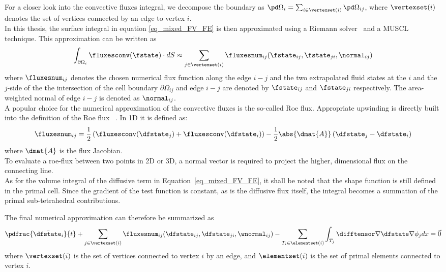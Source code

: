 \documentclass[../main.tex]{subfiles}
\begin{document}
For a closer look into the convective fluxes integral, we decompose the boundary as $\pd \Omega_i = \sum_{i \in \vertexset(i)} \pd\Omega_{ij}$, where $\vertexset(i)$ denotes the set of vertices connected by an edge to vertex $i$.\\
In this thesis, the surface integral in equation \eqref{eq_mixed_FV_FE} is then approximated using a Riemann solver~\cite{Roe1981} and a \ac{MUSCL} \cite{VanLeer1979} technique. This approximation can be written as
\begin{align}\label{eq:convectiveterm_approximation}
\int_{\partial\Omega_i} \fluxesconv(\fstate)\cdot dS \approx
\sum_{j \in \vertexset(i)} \fluxesnum_{ij}(\fstate_{ij},\fstate_{ji},\normal_{ij})
\end{align}
where $\fluxesnum_{ij}$ denotes the chosen numerical flux function along the edge $i-j$ and the two extrapolated fluid states at the $i$ and the $j$-side of the the intersection of the cell boundary $\partial \Omega_{ij}$ and edge $i-j$ are denoted by $\fstate_{ij}$ and $\fstate_{ji}$ respectively. The area-weighted normal of edge $i-j$ is denoted as $\normal_{ij}$.
 \\
 A popular choice for the numerical approximation of the convective fluxes is the so-called Roe flux. Appropriate upwinding is directly built into the definition of the Roe flux ~\cite{Roe1981}. In 1D it is defined as:
 \begin{align}
\fluxesnum_{ij}=\frac{1}{2} \left(\fluxesconv(\dfstate_j)+\fluxesconv(\dfstate_i) \right)-\frac{1}{2}\abs{
\dmat{A}} \left( \dfstate_j-\dfstate_i \right)
 \end{align}
where $\dmat{A}$ is the flux Jacobian.
 \\
To evaluate a roe-flux between two points in 2D or 3D, a normal vector is required to project the higher, dimensional flux on the connecting line.
\\
As for the volume integral of the diffusive term in Equation~\eqref{eq_mixed_FV_FE}, it shall be noted that the shape function is still defined in the primal cell. Since the gradient of the test function is constant, as is the diffusive flux itself, the integral becomes a summation of the primal sub-tetrahedral contributions.


The final numerical approximation can therefore be summarized as
\begin{align}\label{eq:nse_final_discretized}
\pdfrac{\bar{\dfstate_i}}{t} +
\sum_{j \in \vertexset(i)} \fluxesnum_{ij}(\dfstate_{ij},\dfstate_{ji},\wnormal_{ij}) -
\sum_{T_i \in \elementset(i)} \int_{T_j} \difftensor \nabla \dfstate \nabla \phi_j dx =
\vec{0}
\end{align}
where $\vertexset(i)$ is the set of vertices connected to vertex $i$ by an edge, and $\elementset(i)$ is the set of primal elements connected to vertex $i$.
\end{document}
